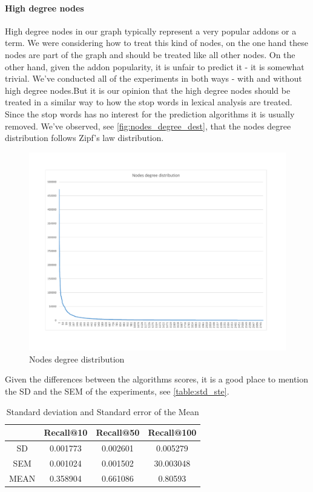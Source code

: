 \documentclass[11pt,oneside]{book}
\begin{document}
\paragraph{High degree nodes}
High degree nodes in our graph typically represent a very popular addons or a term. We were considering how to treat this kind of nodes, on the one hand these nodes are part of the graph and should be treated like all other nodes. On the other hand, given the addon popularity, it is unfair to predict it - it is somewhat trivial. We've conducted all of the experiments in both ways - with and without high degree nodes.But it is our opinion that the high degree nodes should be treated in a similar way to how the stop words in lexical analysis are treated. Since the stop words has no interest for the prediction algorithms it is usually removed. We've observed, see \autoref{fig:nodes_degree_dest}, that the nodes degree distribution follows Zipf's law distribution.
\begin{figure}[h]
\centering
\includegraphics[width=\linewidth]{figures/nodesDegreeDest.pdf}
\caption{Nodes degree distribution}
\label{fig:nodes_degree_dest}
\end{figure}
\par
Given the differences between the algorithms scores, it is a good place to mention the SD and the SEM of the experiments, see \autoref{table:std_ste}.
\begin{table}[h]
\centering
\caption{Standard deviation and Standard error of the Mean}
\label{table:std_ste}
\begin{tabular}{|c|c|c|c|} \hline
 & Recall@10 & Recall@50 & Recall@100\\ \hline
SD & 0.001773 & 0.002601 & 0.005279\\ \hline
SEM & 0.001024 & 0.001502 & 30.003048\\ \hline
MEAN & 0.358904 & 0.661086 & 0.80593\\ \hline
\end{tabular}
\end{table}
\end{document}
